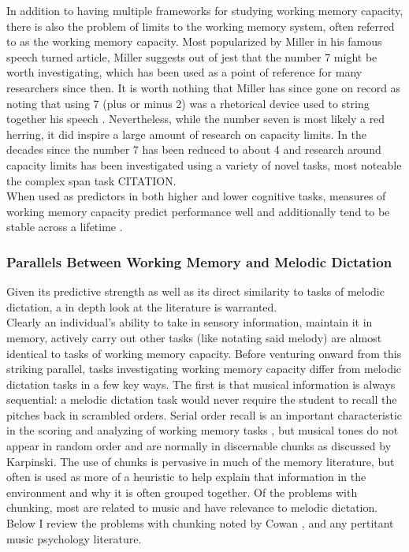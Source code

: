 \documentclass[]{book}
\begin{document}
In addition to having multiple frameworks for studying working memory capacity, there is also the problem of limits to the working memory system, often referred to as the working memory capacity.
Most popularized by Miller in his famous \citep{millerMagicalNumberSeven1956} speech turned article, Miller suggests out of jest that the number 7 might be worth investigating, which has been used as a point of reference for many researchers since then.
It is worth nothing that Miller has since gone on record as noting that using 7 (plus or minus 2) was a rhetorical device used to string together his speech \citep{millerHistoryPsychologyAutobiography1989}.
Nevertheless, while the number seven is most likely a red herring, it did inspire a large amount of research on capacity limits.
In the decades since the number 7 has been reduced to about 4 \citep{cowanMagicalMysteryFour2010} and research around capacity limits has been investigated using a variety of novel tasks, most noteable the complex span task CITATION.\\
When used as predictors in both higher and lower cognitive tasks, measures of working memory capacity predict performance well and additionally tend to be stable across a lifetime \citep{unsworthAutomatedVersionOperation2005}.

\hypertarget{parallels-between-working-memory-and-melodic-dictation}{%
\subsubsection{Parallels Between Working Memory and Melodic Dictation}\label{parallels-between-working-memory-and-melodic-dictation}}

Given its predictive strength as well as its direct similarity to tasks of melodic dictation, a in depth look at the literature is warranted.\\
Clearly an individual's ability to take in sensory information, maintain it in memory, actively carry out other tasks (like notating said melody) are almost identical to tasks of working memory capacity.
Before venturing onward from this striking parallel, tasks investigating working memory capacity differ from melodic dictation tasks in a few key ways.
The first is that musical information is always sequential: a melodic dictation task would never require the student to recall the pitches back in scrambled orders.
Serial order recall is an important characteristic in the scoring and analyzing of working memory tasks \citep{conwayWorkingMemorySpan2005}, but musical tones do not appear in random order and are normally in discernable chunks as discussed by Karpinski\citep{karpinskiAuralSkillsAcquisition2000}.
The use of chunks is pervasive in much of the memory literature, but often is used as more of a heuristic to help explain that information in the environment and why it is often grouped together.
Of the problems with chunking, most are related to music and have relevance to melodic dictation.
Below I review the problems with chunking noted by Cowan \citep{cowanWorkingMemoryCapacity2005}, and any pertitant music psychology literature.
\end{document}

